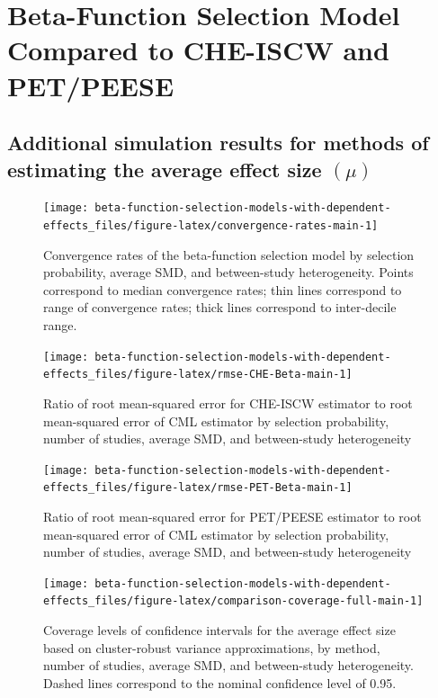 \documentclass[
  american,
  man, donotrepeattitle,floatsintext]{apa7}
\begin{document}
\endgroup

\appendix


\section{Beta-Function Selection Model Compared to CHE-ISCW and PET/PEESE}\label{beta-function-selection-model-compared-to-che-iscw-and-petpeese}

\subsection{\texorpdfstring{Additional simulation results for methods of estimating the average effect size \((\mu)\)}{Additional simulation results for methods of estimating the average effect size (\textbackslash mu)}}\label{mu-simulation-results-main}

\begin{figure}
\texttt{[image: beta-function-selection-models-with-dependent-effects\_files/figure-latex/convergence-rates-main-1]} \caption{Convergence rates of the beta-function selection model by selection probability, average SMD, and between-study heterogeneity. Points correspond to median convergence rates; thin lines correspond to range of convergence rates; thick lines correspond to inter-decile range.}\label{fig:convergence-rates-main}
\end{figure}

\begin{figure}
\texttt{[image: beta-function-selection-models-with-dependent-effects\_files/figure-latex/rmse-CHE-Beta-main-1]} \caption{Ratio of root mean-squared error for CHE-ISCW estimator to root mean-squared error of CML estimator by selection probability, number of studies, average SMD, and between-study heterogeneity}\label{fig:rmse-CHE-Beta-main}
\end{figure}

\begin{figure}
\texttt{[image: beta-function-selection-models-with-dependent-effects\_files/figure-latex/rmse-PET-Beta-main-1]} \caption{Ratio of root mean-squared error for PET/PEESE estimator to root mean-squared error of CML estimator by selection probability, number of studies, average SMD, and between-study heterogeneity}\label{fig:rmse-PET-Beta-main}
\end{figure}

\begin{figure}
\texttt{[image: beta-function-selection-models-with-dependent-effects\_files/figure-latex/comparison-coverage-full-main-1]} \caption{Coverage levels of confidence intervals for the average effect size based on cluster-robust variance approximations, by method, number of studies, average SMD, and between-study heterogeneity. Dashed lines correspond to the nominal confidence level of 0.95.}\label{fig:comparison-coverage-full-main}
\end{figure}
\end{document}
